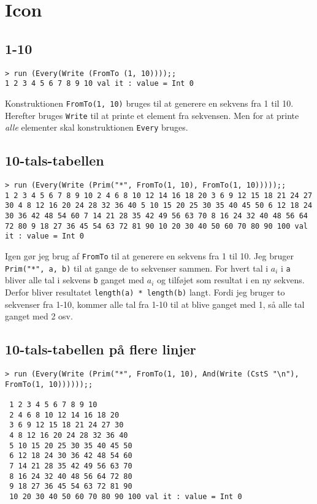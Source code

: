 \section{Icon}

\subsection{1-10}

\begin{verbatim}
> run (Every(Write (FromTo (1, 10))));;
1 2 3 4 5 6 7 8 9 10 val it : value = Int 0
\end{verbatim}

Konstruktionen \texttt{FromTo(1, 10)} bruges til at generere en sekvens fra 1 til 10. Herefter bruges \texttt{Write} til at printe et element fra sekvensen. Men for at printe \textit{alle} elementer skal konstruktionen \texttt{Every} bruges.

\subsection{10-tals-tabellen}

\begin{verbatim}
> run (Every(Write (Prim("*", FromTo(1, 10), FromTo(1, 10)))));;
1 2 3 4 5 6 7 8 9 10 2 4 6 8 10 12 14 16 18 20 3 6 9 12 15 18 21 24 27 30 4 8 12 16 20 24 28 32 36 40 5 10 15 20 25 30 35 40 45 50 6 12 18 24 30 36 42 48 54 60 7 14 21 28 35 42 49 56 63 70 8 16 24 32 40 48 56 64 72 80 9 18 27 36 45 54 63 72 81 90 10 20 30 40 50 60 70 80 90 100 val it : value = Int 0
\end{verbatim}

Igen gør jeg brug af \texttt{FromTo} til at generere en sekvens fra 1 til 10. Jeg bruger \texttt{Prim("*", a, b)} til at gange de to sekvenser sammen. For hvert tal i $a_i$ i \texttt{a} bliver alle tal i sekvens \texttt{b} ganget med $a_i$ og tilføjet som resultat i en ny sekvens. Derfor bliver resultatet \texttt{length(a) * length(b)} langt. Fordi jeg bruger to sekvenser fra 1-10, kommer alle tal fra 1-10 til at blive ganget med 1, så alle tal ganget med 2 osv.

\subsection{10-tals-tabellen på flere linjer}

\begin{verbatim}
> run (Every(Write (Prim("*", FromTo(1, 10), And(Write (CstS "\n"), FromTo(1, 10))))));;

 1 2 3 4 5 6 7 8 9 10
 2 4 6 8 10 12 14 16 18 20
 3 6 9 12 15 18 21 24 27 30
 4 8 12 16 20 24 28 32 36 40
 5 10 15 20 25 30 35 40 45 50
 6 12 18 24 30 36 42 48 54 60
 7 14 21 28 35 42 49 56 63 70
 8 16 24 32 40 48 56 64 72 80
 9 18 27 36 45 54 63 72 81 90
 10 20 30 40 50 60 70 80 90 100 val it : value = Int 0
\end{verbatim}

